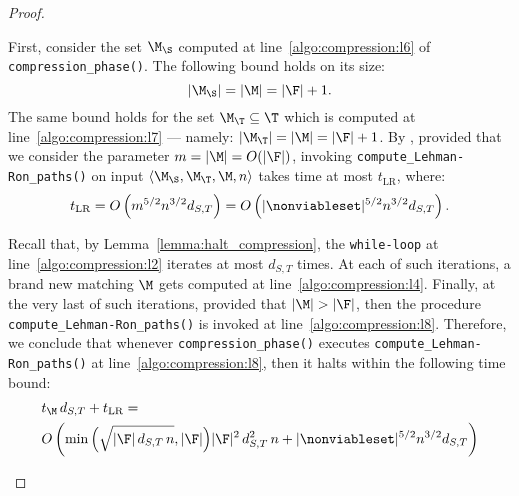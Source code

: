 \begin{proof}
\begin{enumerate}
First, consider the set $\M_\S$ computed at line~\ref{algo:compression:l6} of \texttt{compression\_phase()}.
The following bound holds on its size: \[|\M_\S| = |\M| = |\F| + 1.\]
The same bound holds for the set $\M_\T\subseteq \T$ which is computed at line~\ref{algo:compression:l7} --- namely:
$|\M_\T| = |\M| = |\F|+1$.
By , provided that we consider the parameter $m=|\M|=O(|\F|)$,
invoking \texttt{compute\_Lehman-Ron\_paths()}
on input $\langle \M_\S, \M_\T, \M, n \rangle$ takes time at most $t_{\text{LR}}$, where:
$$t_{\text{LR}} = O\left( m^{5/2} n^{3/2} d_{S,T}  \right) = O\left( |\nonviableset|^{5/2} n^{3/2} d_{S,T} \right).$$

Recall that, by Lemma~\ref{lemma:halt_compression}, the \texttt{while-loop}
at line~\ref{algo:compression:l2} iterates at most $d_{S,T}$ times.
At each of such iterations, a brand new matching $\M$ gets computed at line~\ref{algo:compression:l4}.
Finally, at the very last of such iterations, provided that $|\M|>|\F|$, then the procedure
\texttt{compute\_Lehman-Ron\_paths()} is invoked at line~\ref{algo:compression:l8}.
Therefore, we conclude that whenever \texttt{compression\_phase()}
executes \texttt{compute\_Lehman-Ron\_paths()} at line~\ref{algo:compression:l8},
then it halts within the following time bound:
\begin{align*}
& t_\M  \, d_{S,T}  + t_{\text{LR}}  = \\
& O\left(\min\Big(\sqrt{|\F|\, d_{S,T}\, n}, |\F|\Big) |\F|^2\, d^2_{S,T}\, n + |\nonviableset|^{5/2} n^{3/2} d_{S,T} \right)
\end{align*}
\end{enumerate}
\end{proof}

